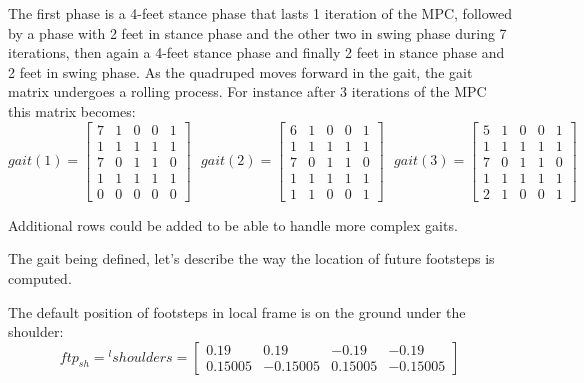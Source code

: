 \documentclass[a4paper,11pt]{article}
\begin{document}
The first phase is a 4-feet stance phase that lasts 1 iteration of the MPC, followed by a phase with 2 feet in stance phase and the other two in swing phase during 7 iterations, then again a 4-feet stance phase and finally 2 feet in stance phase and 2 feet in swing phase. As the quadruped moves forward in the gait, the gait matrix undergoes a rolling process. For instance after 3 iterations of the MPC this matrix becomes:
\begin{equation}
gait(1) = \begin{bmatrix} 
7 & 1 & 0 & 0 & 1 \\
1 & 1 & 1 & 1 & 1 \\
7 & 0 & 1 & 1 & 0 \\
1 & 1 & 1 & 1 & 1 \\
0 & 0 & 0 & 0 & 0 \end{bmatrix} 
\text{ }
gait(2) = \begin{bmatrix} 
6 & 1 & 0 & 0 & 1 \\
1 & 1 & 1 & 1 & 1 \\
7 & 0 & 1 & 1 & 0 \\
1 & 1 & 1 & 1 & 1 \\
1 & 1 & 0 & 0 & 1 \end{bmatrix} 
\text{ }
gait(3) = \begin{bmatrix} 
5 & 1 & 0 & 0 & 1 \\
1 & 1 & 1 & 1 & 1 \\
7 & 0 & 1 & 1 & 0 \\
1 & 1 & 1 & 1 & 1 \\
2 & 1 & 0 & 0 & 1 \end{bmatrix} 
\end{equation}

Additional rows could be added to be able to handle more complex gaits.

The gait being defined, let's describe the way the location of future footsteps is computed.

The default position of footsteps in local frame is on the ground under the shoulder:
\begin{equation}
{ftp}_{sh} = {}^l\!shoulders = \begin{bmatrix} 0.19 & 0.19 & -0.19 & -0.19 \\ 0.15005 & -0.15005 & 0.15005 & -0.15005 \end{bmatrix}
\end{equation}
\end{document}
